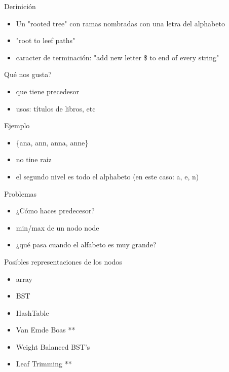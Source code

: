 \documentclass[presentation]{beamer}
\begin{document}
\begin{frame}[label=sec-8]{Derinición}
\begin{itemize}
\item Un "rooted tree" con ramas nombradas con una letra del alphabeto
\item "root to leef paths"
\item caracter de terminación: "add new letter \$ to end of every string"
\end{itemize}
\begin{block}{Qué nos gusta?}
\begin{itemize}
\item que tiene precedesor

\item usos: títulos de libros,  etc
\end{itemize}

\begin{block}{Ejemplo}
\begin{itemize}
\item \{ana, ann, anna, anne\}
\item no tine raiz
\item el segundo nivel es todo el alphabeto (en este caso: a, e, n)
\end{itemize}
\end{block}
\begin{block}{Problemas}
\begin{itemize}
\item ¿Cómo haces predecesor?
\item min/max de un nodo node
\item ¿qué pasa cuando el alfabeto es muy grande?
\end{itemize}
\end{block}
\end{block}
\end{frame}
\begin{frame}[label=sec-9]{Posibles representaciones de los nodos}
\begin{itemize}
\item array
\item BST
\item HashTable
\item Van Emde Boas   **
\item Weight Balanced BST's
\item Leaf Trimming **
\end{itemize}
\end{frame}
\end{document}
